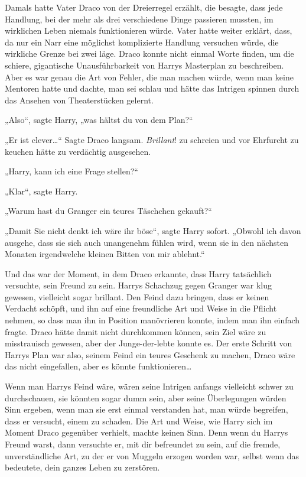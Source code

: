 {Damals hatte Vater Draco von der Dreierregel erzählt, die besagte, dass jede Handlung, bei der mehr als drei verschiedene Dinge passieren mussten, im wirklichen Leben niemals funktionieren würde. Vater hatte weiter erklärt, dass, da nur ein Narr eine möglichst komplizierte Handlung versuchen würde, die wirkliche Grenze bei zwei läge. Draco konnte nicht einmal Worte finden, um die schiere, gigantische Unausführbarkeit von Harrys Masterplan zu beschreiben. Aber es war genau die Art von Fehler, die man machen würde, wenn man keine Mentoren hatte und dachte, man sei schlau und hätte das Intrigen spinnen durch das Ansehen von Theaterstücken gelernt.

„Also“, sagte Harry, „was hältst du von dem Plan?“

„Er ist clever…“ Sagte Draco langsam. \emph{Brillant}! zu schreien und vor Ehrfurcht zu keuchen hätte zu verdächtig ausgesehen.

„Harry, kann ich eine Frage stellen?“

„Klar“, sagte Harry.

„Warum hast du Granger ein teures Täschchen gekauft?“

„Damit Sie nicht denkt ich wäre ihr böse“, sagte Harry sofort. „Obwohl ich davon ausgehe, dass sie sich auch unangenehm fühlen wird, wenn sie in den nächsten Monaten irgendwelche kleinen Bitten von mir ablehnt.“

Und das war der Moment, in dem Draco erkannte, dass Harry tatsächlich versuchte, sein Freund zu sein. Harrys Schachzug gegen Granger war klug gewesen, vielleicht sogar brillant. Den Feind dazu bringen, dass er keinen Verdacht schöpft, und ihn auf eine freundliche Art und Weise in die Pflicht nehmen, so dass man ihn in Position manövrieren konnte, indem man ihn einfach fragte. Draco hätte damit nicht durchkommen können, sein Ziel wäre zu misstrauisch gewesen, aber der Junge-der-lebte konnte es. Der erste Schritt von Harrys Plan war also, seinem Feind ein teures Geschenk zu machen, Draco wäre das nicht eingefallen, aber es könnte funktionieren…

Wenn man Harrys Feind wäre, wären seine Intrigen anfangs vielleicht schwer zu durchschauen, sie könnten sogar dumm sein, aber seine Überlegungen würden Sinn ergeben, wenn man sie erst einmal verstanden hat, man würde begreifen, dass er versucht, einem zu schaden. Die Art und Weise, wie Harry sich im Moment Draco gegenüber verhielt, machte keinen Sinn. Denn wenn du Harrys Freund warst, dann versuchte er, mit dir befreundet zu sein, auf die fremde, unverständliche Art, zu der er von Muggeln erzogen worden war, selbst wenn das bedeutete, dein ganzes Leben zu zerstören.

}
